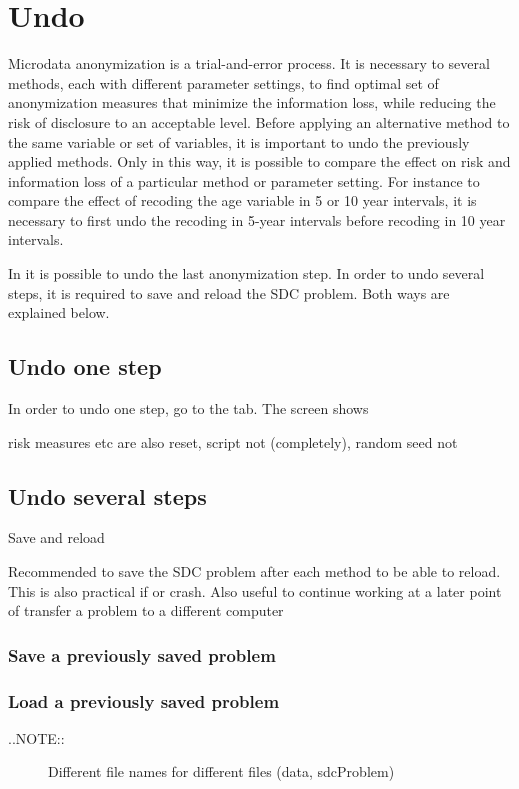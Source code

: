 \documentclass[letterpaper,10pt,english]{sphinxmanual}
\begin{document}
\chapter{Undo}
\label{\detokenize{undo::doc}}\label{\detokenize{undo:undo}}
Microdata anonymization is a trial-and-error process. It is necessary to several
methods, each with different parameter settings, to find optimal set of
anonymization measures that minimize the information loss, while reducing the risk of
disclosure to an acceptable level. Before applying an alternative method to the same
variable or set of variables, it is important to undo the previously applied methods.
Only in this way, it is possible to compare the effect on risk and information
loss of a particular method or parameter setting. For instance to compare the
effect of recoding the age variable in 5 or 10 year intervals, it is necessary to first
undo the recoding in 5-year intervals before recoding in 10 year intervals.

In  it is possible to undo the last anonymization step. In order to undo several
steps, it is required to save and reload the SDC problem. Both ways are explained below.


\section{Undo one step}
\label{\detokenize{undo:undo-one-step}}
In order to undo one step, go to the  tab.
The screen shows

risk measures etc are also reset, script not (completely), random seed not


\section{Undo several steps}
\label{\detokenize{undo:undo-several-steps}}
Save and reload

Recommended to save the SDC problem after each method to be able to reload. This is also
practical if  or  crash. Also useful to continue working at a later point of
transfer a problem to a different computer


\subsection{Save a previously saved problem}
\label{\detokenize{undo:save-a-previously-saved-problem}}

\subsection{Load a previously saved problem}
\label{\detokenize{undo:load-a-previously-saved-problem}}\begin{description}
\item[{..NOTE::}] \leavevmode
Different file names for different files (data, sdcProblem)

\end{description}



\renewcommand{\indexname}{Index}
\printindex
\end{document}
